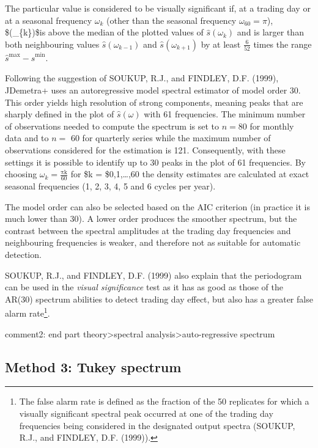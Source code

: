 \documentclass[
  letterpaper,
  DIV=11,
  numbers=noendperiod]{scrreprt}
\begin{document}
The particular value is considered to be visually significant if, at a
trading day or at a seasonal frequency \(\omega_{k}\) (other than the
seasonal frequency \(\omega_{60} = \pi\)),
\$(\omega\_\{k\})\$is above the median of the plotted values
of \(\widehat{s}(\omega_{k})\) and is larger than both neighbouring
values \(\widehat{s}(\omega_{k - 1})\) and
\(\widehat{s}(\omega_{k + 1})\) by at least \(\frac{6}{52}\) times the
range \({\widehat{s}}^{\max} - {\widehat{s}}^{\min}\).

Following the suggestion of SOUKUP, R.J., and FINDLEY, D.F. (1999),
JDemetra+ uses an autoregressive model spectral estimator of model order
30. This order yields high resolution of strong components, meaning
peaks that are sharply defined in the plot of \(\widehat{s}(\omega)\)
with 61 frequencies. The minimum number of observations needed to
compute the spectrum is set to \(n=80\) for monthly data and to \(n =\)
60 for quarterly series while the maximum number of observations
considered for the estimation is 121. Consequently, with these settings
it is possible to identify up to 30 peaks in the plot of 61 frequencies.
By choosing \(\omega_{k} = \frac{\text{πk}}{60}\) for \$k =
\$0,1,\ldots,60 the density estimates are calculated at exact seasonal
frequencies (1, 2, 3, 4, 5 and 6 cycles per year).

The model order can also be selected based on the AIC criterion (in
practice it is much lower than 30). A lower order produces the smoother
spectrum, but the contrast between the spectral amplitudes at the
trading day frequencies and neighbouring frequencies is weaker, and
therefore not as suitable for automatic detection.

SOUKUP, R.J., and FINDLEY, D.F. (1999) also explain that the periodogram
can be used in the \emph{visual significance} test as it has as good as
those of the AR(30) spectrum abilities to detect trading day effect, but
also has a greater false alarm rate\footnote{The false alarm rate is
  defined as the fraction of the 50 replicates for which a visually
  significant spectral peak occurred at one of the trading day
  frequencies being considered in the designated output spectra (SOUKUP,
  R.J., and FINDLEY, D.F. (1999)).}.

comment2: end part theory\textgreater spectral
analysis\textgreater auto-regressive spectrum

\hypertarget{method-3-tukey-spectrum}{%
\subsection{Method 3: Tukey spectrum}\label{method-3-tukey-spectrum}}
\end{document}
